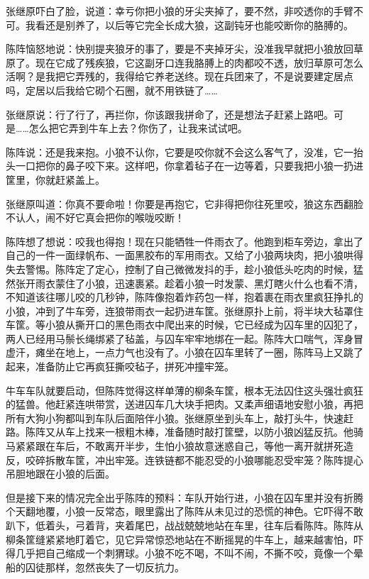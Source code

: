 \par 张继原吓白了脸，说道：幸亏你把小狼的牙尖夹掉了，要不然，非咬透你的手臂不可。我看还是别养了，以后等它完全长成大狼，这副钝牙也能咬断你的胳膊的。
\par 陈阵恼怒地说：快别提夹狼牙的事了，要是不夹掉牙尖，没准我早就把小狼放回草原了。现在它成了残疾狼，它这副牙口连我胳膊上的肉都咬不透，放归草原可怎么活啊？是我把它弄残的，我得给它养老送终。现在兵团来了，不是说要建定居点吗，定居以后我给它砌个石圈，就不用铁链了……
\par 张继原说：行了行了，再拦你，你该跟我拼命了，还是想法子赶紧上路吧。可是……怎么把它弄到牛车上去？你伤了，让我来试试吧。
\par 陈阵说：还是我来抱。小狼不认你，它要是咬你就不会这么客气了，没准，它一抬头一口把你的鼻子咬下来。这样吧，你拿着毡子在一边等着，只要我把小狼一扔进筐里，你就赶紧盖上。
\par 张继原叫道：你真不要命啦！你要是再抱它，它非得把你往死里咬，狼这东西翻脸不认人，闹不好它真会把你的喉咙咬断！
\par 陈阵想了想说：咬我也得抱！现在只能牺牲一件雨衣了。他跑到柜车旁边，拿出了自己的一件一面绿帆布、一面黑胶布的军用雨衣。又给了小狼两块肉，把小狼哄得失去警惕。陈阵定了定心，控制了自己微微发抖的手，趁小狼低头吃肉的时候，猛然张开雨衣蒙住了小狼，迅速裹紧。趁着小狼一时发蒙、黑灯瞎火什么也看不清，不知道该往哪儿咬的几秒钟，陈阵像抱着炸药包一样，抱着裹在雨衣里疯狂挣扎的小狼，冲到了牛车旁，连狼带雨衣一起扔进车筐。张继原扑上前，将半块大毡罩住车筐。等小狼从撕开口的黑色雨衣中爬出来的时候，它已经成为囚车里的囚犯了，两人已经用马鬃长绳绑紧了毡盖，与囚车牢牢地绑在一起。陈阵大口喘气，浑身冒虚汗，瘫坐在地上，一点力气也没有了。小狼在囚车里转了一圈，陈阵马上又跳了起来，准备防止它再疯狂撕咬毡子，拼死冲撞牢笼。
\par 牛车车队就要启动，但陈阵觉得这样单薄的柳条车筐，根本无法囚住这头强壮疯狂的猛兽。他赶紧连哄带赏，送进囚车几大块手把肉。又柔声细语地安慰小狼，再把所有大狗小狗都叫到车队后面陪伴小狼。张继原坐到头车上，敲打头牛，快速赶路。陈阵又从车上找来一根粗木棒，准备随时敲打筐壁，以防小狼凶猛反抗。他骑马紧紧跟在车后，不敢离开半步，生怕小狼故意迷惑自己，等他一离开就拼死造反，咬碎拆散车筐，冲出牢笼。连铁链都不能忍受的小狼哪能忍受牢笼？陈阵提心吊胆地跟在小狼的后面。
\par 但是接下来的情况完全出乎陈阵的预料：车队开始行进，小狼在囚车里并没有折腾个天翻地覆，小狼一反常态，眼里露出了陈阵从未见过的恐慌的神色。它吓得不敢趴下，低着头，弓着背，夹着尾巴，战战兢兢地站在车里，往车后看陈阵。陈阵从柳条筐缝紧紧地盯着它，见它异常惊恐地站在不断摇晃的牛车上，越来越害怕，吓得几乎把自己缩成一个刺猬球。小狼不吃不喝，不叫不闹，不撕不咬，竟像一个晕船的囚徒那样，忽然丧失了一切反抗力。
